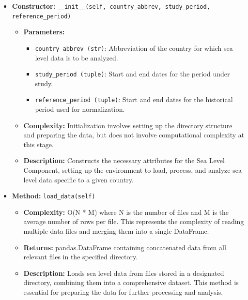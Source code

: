 \documentclass[a4paper,12pt]{article}
\begin{document}
\begin{itemize}
    \item \textbf{Constructor:} \texttt{\_\_init\_\_(self, country\_abbrev, study\_period, reference\_period)}
    \begin{itemize}
        \item \textbf{Parameters:}
        \begin{itemize}
            \item \texttt{country\_abbrev (str)}: Abbreviation of the country for which sea level data is to be analyzed.
            \item \texttt{study\_period (tuple)}: Start and end dates for the period under study.
            \item \texttt{reference\_period (tuple)}: Start and end dates for the historical period used for normalization.
        \end{itemize}
        \item \textbf{Complexity:} Initialization involves setting up the directory structure and preparing the data, but does not involve computational complexity at this stage.
        \item \textbf{Description:} Constructs the necessary attributes for the Sea Level Component, setting up the environment to load, process, and analyze sea level data specific to a given country.
    \end{itemize}

    \item \textbf{Method:} \texttt{load\_data(self)}
    \begin{itemize}
        \item \textbf{Complexity:} O(N * M) where N is the number of files and M is the average number of rows per file. This represents the complexity of reading multiple data files and merging them into a single DataFrame.
        \item \textbf{Returns:} pandas.DataFrame containing concatenated data from all relevant files in the specified directory.
        \item \textbf{Description:} Loads sea level data from files stored in a designated directory, combining them into a comprehensive dataset. This method is essential for preparing the data for further processing and analysis.
    \end{itemize}


\end{itemize}
\end{document}
